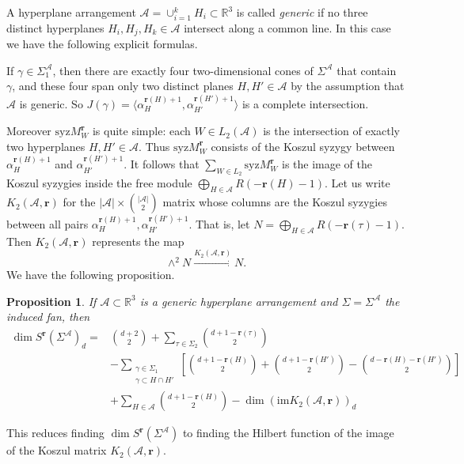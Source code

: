 \documentclass[11pt, reqno]{amsart}
\newcommand{\RR}{\mathbb{R}}
\newcommand{\R}{\mathbb{R}}
\newcommand{\br}{\mathbf{r}}
\newcommand{\A}{\mathcal{A}}
\newcommand{\syz}{\mathrm{syz}}
\newtheorem{proposition}[theorem]{Proposition}
\theoremstyle{definition}
\theoremstyle{remark}
\numberwithin{equation}{section}
\begin{document}
A hyperplane arrangement $\A=\cup_{i=1}^k H_i\subset\R^3$ is called \textit{generic} if no three distinct hyperplanes $H_i,H_j,H_k\in \A$ intersect along a common line.  In this case we have the following explicit formulas.

If $\gamma\in \Sigma^{\A}_1$, then there are exactly four two-dimensional cones of $\Sigma^\A$ that contain $\gamma$, and these four span only two distinct planes $H,H'\in\A$ by the assumption that $\A$ is generic.  So $J(\gamma)=\langle \alpha_H^{\br(H)+1},\alpha_{H'}^{\br(H')+1}\rangle$ is a complete intersection.

Moreover $\syz M^{\br}_W$ is quite simple: each $W\in L_2(\A)$ is the intersection of exactly two hyperplanes $H,H'\in\A$.  Thus $\syz M^{\br}_W$ consists of the Koszul syzygy between $\alpha_H^{\br(H)+1}$ and $\alpha_{H'}^{\br(H')+1}$.  It follows that $\sum_{W\in L_2} \syz M^{\br}_W$ is the image of the Koszul syzygies inside the free module $\bigoplus_{H\in\A} R(-\br(H)-1)$.  Let us write $K_2(\A,\br)$ for the $|\A|\times \binom{|\A|}{2}$ matrix whose columns are the Koszul syzygies between all pairs $\alpha_H^{\br(H)+1},\alpha_{H'}^{\br(H')+1}$.  That is, let $N=\bigoplus_{H\in\A} R(-\br(\tau)-1)$.  Then $K_2(\A,\br)$ represents the map
\[
\wedge^2 N \xrightarrow{K_2(\A,\br)} N.
\]
We have the following proposition.

\begin{proposition}\label{prop:GenericKoszul}
If $\A\subset \RR^3$ is a generic hyperplane arrangement and $\Sigma=\Sigma^\A$ the induced fan, then
\begin{align*}
\dim S^{\br}(\Sigma^\A)_d= & \binom{d+2}{2}+\sum_{\tau\in\Sigma_2} \binom{d+1-\br(\tau)}{2}\\
& -\sum_{\substack{\gamma\in\Sigma_1 \\ \gamma\subset H\cap H'}} \left[ \binom{d+1-\br(H)}{2}+\binom{d+1-\br(H')}{2}-\binom{d-\br(H)-\br(H')}{2}\right]\\
&+\sum_{H\in\A} \binom{d+1-\br(H)}{2}-\dim (\mathrm{im} K_2(\A,\br))_d
\end{align*}
\end{proposition}

This reduces finding $\dim S^{\br}(\Sigma^\A)$ to finding the Hilbert function of the image of the Koszul matrix $K_2(\A,\br)$.
\end{document}
